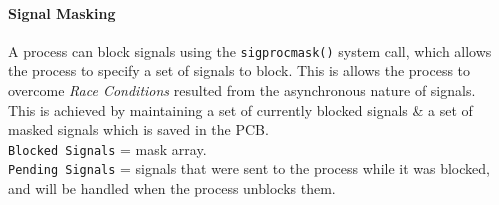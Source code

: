 \documentclass[openany,12pt]{book}
\begin{document}
\paragraph{Signal Masking}
A process can block signals using the \texttt{sigprocmask()} system call, which allows the process to specify a set of signals to block. This is allows the process to overcome \textit{Race Conditions} resulted from the asynchronous nature of signals.\\
\indent This is achieved by maintaining a set of currently blocked signals \& a set of masked signals which is saved in the {\color{blue}PCB}.\\
\texttt{Blocked Signals} = mask array.\\
\texttt{Pending Signals} = signals that were sent to the process while it was blocked, and will be handled when the process unblocks them.

\newpage
\end{document}
